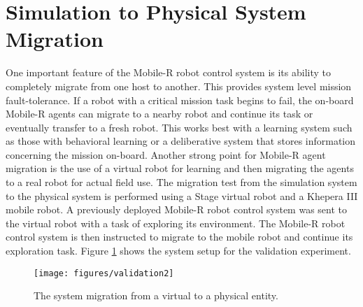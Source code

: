 
  \section{Simulation to Physical System Migration} \label{sec:val_2}
    One important feature of the Mobile-R robot control system is its ability 
      to completely migrate from one host to another.
    This provides system level mission fault-tolerance.
    If a robot with a critical mission task begins to fail, the on-board 
      Mobile-R agents can migrate to a nearby robot and continue its 
      task or eventually transfer to a fresh robot.
    This works best with a learning system such as those with behavioral 
      learning or a deliberative system that stores information concerning 
      the mission on-board.
    Another strong point for Mobile-R agent migration is the use of a 
      virtual robot for learning and then migrating the agents to a real robot
      for actual field use.
    The migration test from the simulation system to the physical system is 
      performed using a Stage virtual robot and a Khepera III mobile robot.
    A previously deployed Mobile-R robot control system was sent to the virtual 
      robot with a task of exploring its environment.
    The Mobile-R robot control system is then instructed to migrate to the mobile 
      robot and continue its exploration task.
    Figure \ref{fig:validation2} shows the system setup for the validation 
       experiment.
    \begin{figure}%
      \centerline{\texttt{[image: figures/validation2]}}
      \caption{The system migration from a virtual to a physical entity.}
      \label{fig:validation2}
    \end{figure}


